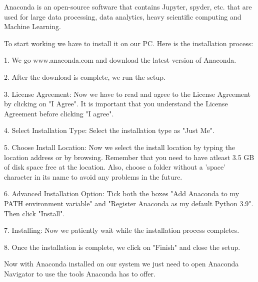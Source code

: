 Anaconda is an open-source software that contains Jupyter, spyder, etc. that are used for large data processing, data analytics, heavy scientific computing and Machine Learning.

To start working we have to install it on our PC. Here is the installation process:

1. We go www.anaconda.com and download the latest version of Anaconda.

2. After the download is complete, we run the setup.

3. License Agreement: Now we have to read and agree to the License Agreement by clicking on "I Agree". 
   It is important that you understand the License Agreement before clicking "I agree".

4. Select Installation Type: Select the installation type as "Just Me".

5. Choose Install Location: Now we select the install location by typing the location address or by browsing. 
   Remember that you need to have atleast 3.5 GB of disk space free at the location. 
   Also, choose a folder without a 'space' character in its name to avoid any problems in the future.

6. Advanced Installation Option: Tick both the boxes "Add Anaconda to my PATH environment variable" and "Register Anaconda as my default Python 3.9". 
   Then click "Install".

7. Installing: Now we patiently wait while the installation process completes.

8. Once the installation is complete, we click on "Finish" and close the setup.

Now with Anaconda installed on our system we just need to open Anaconda Navigator to use the tools Anaconda has to offer.